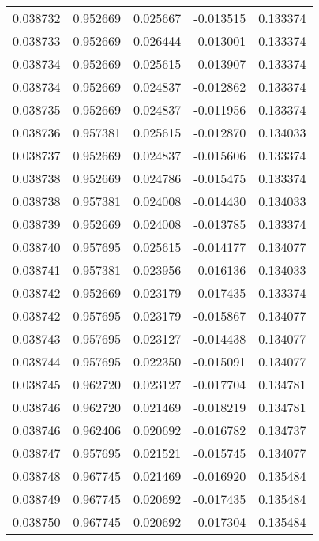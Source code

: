 \begin{tabular}{lrrrr}
0.038732    &  0.952669 &  0.025667 & -0.013515 &             0.133374 \\
0.038733    &  0.952669 &  0.026444 & -0.013001 &             0.133374 \\
0.038734    &  0.952669 &  0.025615 & -0.013907 &             0.133374 \\
0.038734    &  0.952669 &  0.024837 & -0.012862 &             0.133374 \\
0.038735    &  0.952669 &  0.024837 & -0.011956 &             0.133374 \\
0.038736    &  0.957381 &  0.025615 & -0.012870 &             0.134033 \\
0.038737    &  0.952669 &  0.024837 & -0.015606 &             0.133374 \\
0.038738    &  0.952669 &  0.024786 & -0.015475 &             0.133374 \\
0.038738    &  0.957381 &  0.024008 & -0.014430 &             0.134033 \\
0.038739    &  0.952669 &  0.024008 & -0.013785 &             0.133374 \\
0.038740    &  0.957695 &  0.025615 & -0.014177 &             0.134077 \\
0.038741    &  0.957381 &  0.023956 & -0.016136 &             0.134033 \\
0.038742    &  0.952669 &  0.023179 & -0.017435 &             0.133374 \\
0.038742    &  0.957695 &  0.023179 & -0.015867 &             0.134077 \\
0.038743    &  0.957695 &  0.023127 & -0.014438 &             0.134077 \\
0.038744    &  0.957695 &  0.022350 & -0.015091 &             0.134077 \\
0.038745    &  0.962720 &  0.023127 & -0.017704 &             0.134781 \\
0.038746    &  0.962720 &  0.021469 & -0.018219 &             0.134781 \\
0.038746    &  0.962406 &  0.020692 & -0.016782 &             0.134737 \\
0.038747    &  0.957695 &  0.021521 & -0.015745 &             0.134077 \\
0.038748    &  0.967745 &  0.021469 & -0.016920 &             0.135484 \\
0.038749    &  0.967745 &  0.020692 & -0.017435 &             0.135484 \\
0.038750    &  0.967745 &  0.020692 & -0.017304 &             0.135484 \\

\end{tabular}
